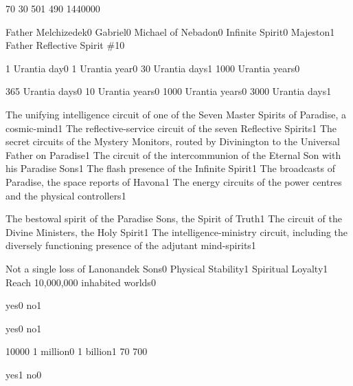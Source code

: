 
{7}{0}
{3}{0}
{50}{1}
{49}{0}
{144000}{0}
\qstop

{Father Melchizedek}{0}
{Gabriel}{0}
{Michael of Nebadon}{0}
{Infinite Spirit}{0}
{Majeston}{1}
{Father Reflective Spirit \#1}{0}
\qstop

{1 Urantia day}{0}
{1 Urantia year}{0}
{30 Urantia days}{1}
{1000 Urantia years}{0}
\qstop

{365 Urantia days}{0}
{10 Urantia years}{0}
{1000 Urantia years}{0}
{3000 Urantia days}{1}
\qstop

{The unifying intelligence circuit of one of the Seven Master Spirits of Paradise, a cosmic-mind}{1}
{The reflective-service circuit of the seven Reflective Spirits}{1}
{The secret circuits of the Mystery Monitors, routed by Divinington to the Universal Father on Paradise}{1}
{The circuit of the intercommunion of the Eternal Son with his Paradise Sons}{1}
{The flash presence of the Infinite Spirit}{1}
{The broadcasts of Paradise, the space reports of Havona}{1}
{The energy circuits of the power centres and the physical controllers}{1}
\qstop

{The bestowal spirit of the Paradise Sons, the Spirit of Truth}{1}
{The circuit of the Divine Ministers, the Holy Spirit}{1}
{The intelligence-ministry circuit, including the diversely functioning presence of the adjutant mind-spirits}{1}
\qstop

{Not a single loss of Lanonandek Sons}{0}
{Physical Stability}{1}
{Spiritual Loyalty}{1}
{Reach 10,000,000 inhabited worlds}{0}
\qstop

{yes}{0}
{no}{1}
\qstop

{yes}{0}
{no}{1}
\qstop

{1000}{0}
{1 million}{0}
{1 billion}{1}
{7}{0}
{70}{0}
\qstop

{yes}{1}
{no}{0}
\qstop

